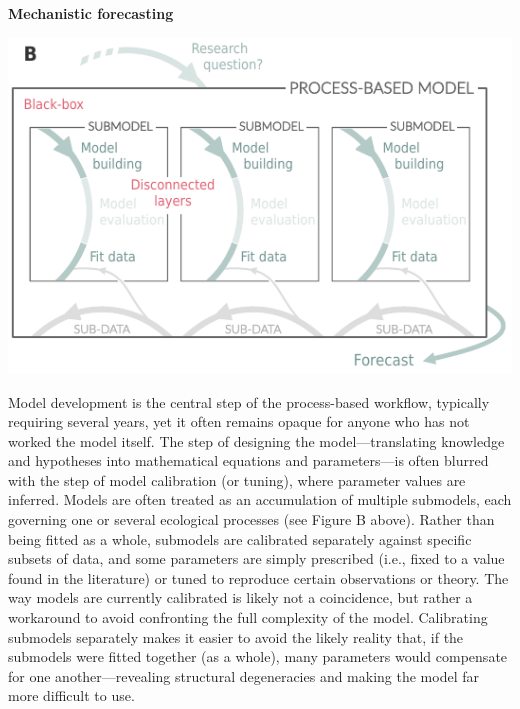 \documentclass[11pt]{article}
\begin{document}
\begin{tcolorbox}
{\begin{multicols}{2}
\centerline{\bf Mechanistic forecasting}
\vspace*{2mm}
\begin{minipage}[t]{\linewidth}
    \includegraphics[width=\linewidth]{../../figures/forecasting_details}

    \vspace*{1mm}
\end{minipage}

\noindent %
Model development is the central step of the process-based workflow, typically requiring several years, yet it often remains opaque for anyone who has not worked the model itself. The step of designing the model---translating knowledge and hypotheses into mathematical equations and parameters---is often blurred with the step of model calibration (or tuning), where parameter values are inferred. Models are often treated as an accumulation of multiple submodels, each governing one or several ecological processes (see Figure B above). Rather than being fitted as a whole, submodels are calibrated separately against specific subsets of data, and some parameters are simply prescribed (i.e., fixed to a value found in the literature) or tuned to reproduce certain observations or theory. The way models are currently calibrated is likely not a coincidence, but rather a workaround to avoid confronting the full complexity of the model. Calibrating submodels separately makes it easier to avoid the likely reality that, if the submodels were fitted together (as a whole), many parameters would compensate for one another---revealing structural degeneracies and making the model far more difficult to use.  %


\end{multicols}}
\end{tcolorbox}
\end{document}
